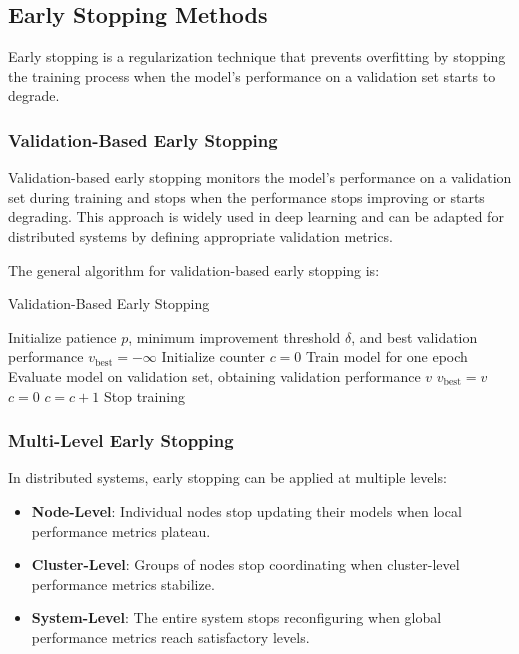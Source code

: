 \documentclass{article}
\begin{document}
\subsection{Early Stopping Methods}

Early stopping is a regularization technique that prevents overfitting by stopping the training process when the model's performance on a validation set starts to degrade.

\subsubsection{Validation-Based Early Stopping}

Validation-based early stopping monitors the model's performance on a validation set during training and stops when the performance stops improving or starts degrading. This approach is widely used in deep learning and can be adapted for distributed systems by defining appropriate validation metrics.

The general algorithm for validation-based early stopping is:

\begin{algorithm}
\caption{Validation-Based Early Stopping}
\begin{algorithmic}[1]
\STATE Initialize patience $p$, minimum improvement threshold $\delta$, and best validation performance $v_{\text{best}} = -\infty$
\STATE Initialize counter $c = 0$
    \STATE Train model for one epoch
    \STATE Evaluate model on validation set, obtaining validation performance $v$
        \STATE $v_{\text{best}} = v$
        \STATE $c = 0$
    \ELSE
        \STATE $c = c + 1$
            \STATE Stop training
        \ENDIF
    \ENDIF
\ENDWHILE
\end{algorithmic}
\end{algorithm}

\subsubsection{Multi-Level Early Stopping}

In distributed systems, early stopping can be applied at multiple levels:

\begin{itemize}
    \item \textbf{Node-Level}: Individual nodes stop updating their models when local performance metrics plateau.
    
    \item \textbf{Cluster-Level}: Groups of nodes stop coordinating when cluster-level performance metrics stabilize.
    
    \item \textbf{System-Level}: The entire system stops reconfiguring when global performance metrics reach satisfactory levels.
\end{itemize}
\end{document}
